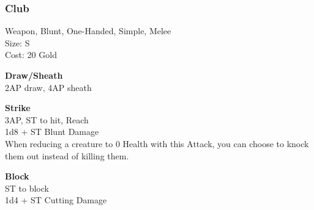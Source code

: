 \subsubsection{Club}\label{weapon:club}
Weapon, Blunt, One-Handed, Simple, Melee\\
Size: S\\
Cost: 20 Gold

\textbf{Draw/Sheath}\\
2AP draw, 4AP sheath

\textbf{Strike}\\
3AP, ST to hit,  Reach\\
1d8 + \texttimes ST Blunt Damage\\
When reducing a creature to 0 Health with this Attack, you can choose to knock them out instead of killing them.

\textbf{Block}\\
ST to block\\
1d4 + \texttimes ST Cutting Damage

